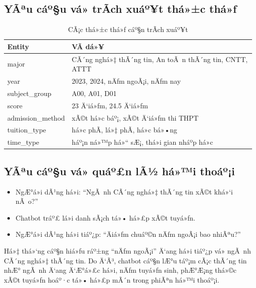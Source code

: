 ﻿\documentclass[12pt,a4paper]{report}
\begin{document}
\subsection{YÃªu cáº§u vá» trÃ­ch xuáº¥t thá»±c thá»ƒ}
\begin{table}[H]
\centering
\caption{CÃ¡c thá»±c thá»ƒ cáº§n trÃ­ch xuáº¥t}
\label{tab:entities_main}
\begin{tabular}{|p{3.2cm}|p{8.8cm}|}
\hline
\textbf{Entity} & \textbf{VÃ­ dá»¥} \\ \hline
major & CÃ´ng nghá»‡ thÃ´ng tin, An toÃ n thÃ´ng tin, CNTT, ATTT \\ \hline
year & 2023, 2024, nÄƒm ngoÃ¡i, nÄƒm nay \\ \hline
subject\_group & A00, A01, D01 \\ \hline
score & 23 Ä‘iá»ƒm, 24.5 Ä‘iá»ƒm \\ \hline
admission\_method & xÃ©t há»c báº¡, xÃ©t Ä‘iá»ƒm thi THPT \\ \hline
tuition\_type & há»c phÃ­, lá»‡ phÃ­, há»c bá»•ng \\ \hline
time\_type & háº¡n ná»™p há»“ sÆ¡, thá»i gian nháº­p há»c \\ \hline
\end{tabular}
\end{table}

\subsection{YÃªu cáº§u vá» quáº£n lÃ½ há»™i thoáº¡i}
\begin{itemize}
    \item NgÆ°á»i dÃ¹ng há»i: ``NgÃ nh CÃ´ng nghá»‡ thÃ´ng tin xÃ©t khá»‘i nÃ o?''
    \item Chatbot tráº£ lá»i danh sÃ¡ch tá»• há»£p xÃ©t tuyá»ƒn.
    \item NgÆ°á»i dÃ¹ng há»i tiáº¿p: ``Äiá»ƒm chuáº©n nÄƒm ngoÃ¡i bao nhiÃªu?''
\end{itemize}

Há»‡ thá»‘ng cáº§n hiá»ƒu ráº±ng ``nÄƒm ngoÃ¡i'' Ä‘ang há»i tiáº¿p vá» ngÃ nh CÃ´ng nghá»‡ thÃ´ng tin. Do Ä‘Ã³, chatbot cáº§n lÆ°u táº¡m cÃ¡c thÃ´ng tin nhÆ° ngÃ nh Ä‘ang Ä‘Æ°á»£c há»i, nÄƒm tuyá»ƒn sinh, phÆ°Æ¡ng thá»©c xÃ©t tuyá»ƒn hoáº·c tá»• há»£p mÃ´n trong phiÃªn há»™i thoáº¡i.
\end{document}
